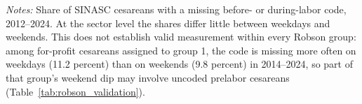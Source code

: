 \begin{table}[H]\centering
\caption{\textbf{Missing timing codes by sector and day type}}
\label{tab:timing_missing}
\small
\small\setlength{\tabcolsep}{4pt}
\begin{minipage}{\linewidth}\footnotesize
\textit{Notes:} Share of SINASC cesareans with a missing before- or during-labor code, 2012--2024. At the sector level the shares differ little between weekdays and weekends. This does not establish valid measurement within every Robson group: among for-profit cesareans assigned to group 1, the code is missing more often on weekdays (11.2 percent) than on weekends (9.8 percent) in 2014--2024, so part of that group's weekend dip may involve uncoded prelabor cesareans (Table~\ref{tab:robson_validation}).
\end{minipage}
\end{table}

